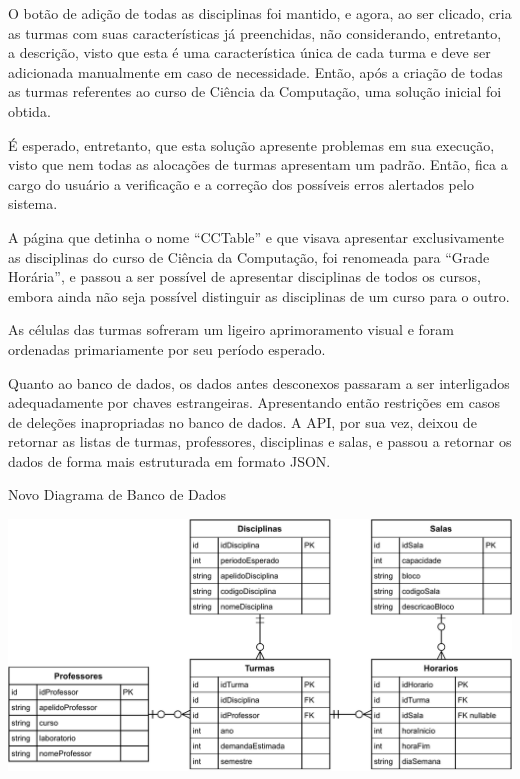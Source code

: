 
O botão de adição de todas as disciplinas foi mantido, e agora, ao ser clicado, cria as turmas com suas características já preenchidas, não considerando, entretanto, a descrição, visto que esta é uma característica única de cada turma e deve ser adicionada manualmente em caso de necessidade. Então, após a criação de todas as turmas referentes ao curso de Ciência da Computação, uma solução inicial foi obtida.

É esperado, entretanto, que esta solução apresente problemas em sua execução, visto que nem todas as alocações de turmas apresentam um padrão. Então, fica a cargo do usuário a verificação e a correção dos possíveis erros alertados pelo sistema.

 \label{ssssec:Grade Horária}

A página que detinha o nome ``CCTable'' e que visava apresentar exclusivamente as disciplinas do curso de Ciência da Computação, foi renomeada para ``Grade Horária'', e passou a ser possível de apresentar disciplinas de todos os cursos, embora ainda não seja possível distinguir as disciplinas de um curso para o outro.

As células das turmas sofreram um ligeiro aprimoramento visual e foram ordenadas primariamente por seu período esperado.

 \label{ssssec:Banco de dados}

Quanto ao banco de dados, os dados antes desconexos passaram a ser interligados adequadamente por chaves estrangeiras. Apresentando então restrições em casos de deleções inapropriadas no banco de dados. A API, por sua vez, deixou de retornar as listas de turmas, professores, disciplinas e salas, e passou a retornar os dados de forma mais estruturada em formato JSON.

\begin{MyCenteredFigure} \caption{Novo Diagrama de Banco de Dados} \label{fig:MVP3_BancoDeDados}
  \includegraphics[width=\textwidth]{files/img/2.02!5-desenvolvimento/2.02!5.1.4-sistema/Diagrama_ER-How_it_should_be.drawio}
\end{MyCenteredFigure}

